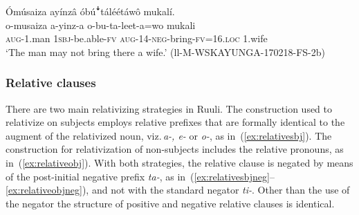 \documentclass[output=paper,colorlinks,citecolor=brown,draftmode]{langscibook}
\begin{document}
\ea \label{ex:bu}\label{ex:ruulietal:26}
	\glll    Ómúsaiza ayínzâ óbúꜜtáléétáwô mukalí.\\
	        o-musaiza a-yinz-a o-bu-ta-leet-a=wo mukali\\
	    	\textsc{aug}-1.man 1\textsc{sbj}-be.able-\textsc{fv} \textsc{aug}-14-\textsc{neg}-bring-\textsc{fv}=16.\textsc{loc} 1.wife\\
\glt ‘The man may not bring there a wife.’ (ll-M-WSKAYUNGA-170218-FS-2b)
\z

\subsubsection{Relative clauses} \label{sec:non-mainrelativeclauses}

There are two main relativizing strategies in Ruuli. 
The construction used to relativize on subjects employs relative prefixes that are formally identical to the augment of the relativized noun, viz.\,\textit{a-, e-} or \textit{o-}, as in~(\ref{ex:relativesbj}). 
The construction for relativization of non-subjects includes the relative pronouns, as in~(\ref{ex:relativeobj}). 
With both strategies, the relative clause is negated by means of the post-initial negative prefix \textit{ta-}, as in~(\ref{ex:relativesbjneg}--\ref{ex:relativeobjneg}), and not with the standard negator \textit{ti-}. 
Other than the use of the negator the structure of positive and negative relative clauses is identical.
\end{document}
